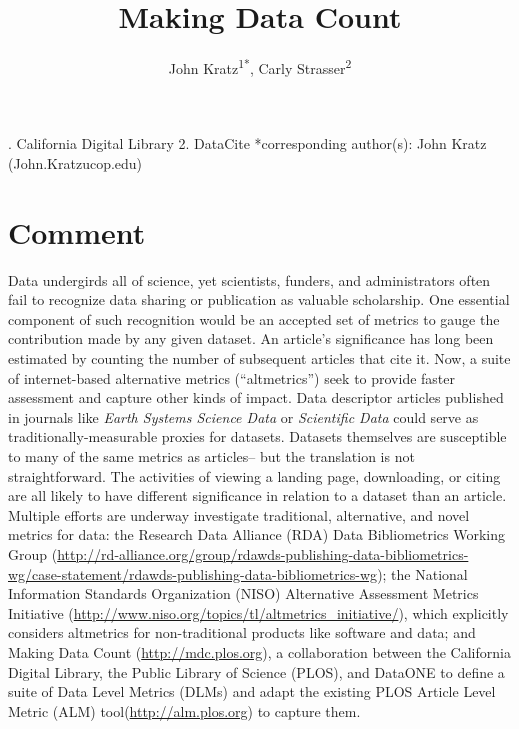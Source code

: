 \documentclass[english]{article}
\begin{document}
\title{Making Data Count}


\author{John Kratz\textsuperscript{1{*}}, Carly Strasser\textsuperscript{2}}

. California Digital Library 2. DataCite 
{*}corresponding author(s): John Kratz (John.Kratzucop.edu)


\section*{Comment}


Data undergirds all of science, yet scientists, funders, and administrators often fail to recognize data sharing or publication as valuable scholarship.
One essential component of such recognition would be an accepted set of metrics to gauge the contribution made by any given dataset.
An article's significance has long been estimated by counting the number of subsequent articles that cite it. 
Now, a suite of internet-based alternative metrics (``altmetrics'') seek to provide faster assessment and capture other kinds of impact\cite{priem_altmetrics_2012}.
Data descriptor articles published in journals like \textit{Earth Systems Science Data} or \textit{Scientific Data} could serve as traditionally-measurable proxies for datasets\cite{pfeiffenberger_earth_2008, editors_more_2014}.
Datasets themselves are susceptible to many of the same metrics as articles-- but the translation is not straightforward.
The activities of viewing a landing page, downloading, or citing are all likely to have different significance in relation to a dataset than an article.
Multiple efforts are underway investigate traditional, alternative, and novel metrics for data: the Research Data Alliance (RDA) Data Bibliometrics Working Group (\url{http://rd-alliance.org/group/rdawds-publishing-data-bibliometrics-wg/case-statement/rdawds-publishing-data-bibliometrics-wg}{}); the National Information Standards Organization (NISO) Alternative Assessment Metrics Initiative (\url{http://www.niso.org/topics/tl/altmetrics_initiative/}), which explicitly considers altmetrics for non-traditional products like software and data; and Making Data Count (\url{http://mdc.plos.org}), a collaboration between the California Digital Library, the Public Library of Science (PLOS), and DataONE to define a suite of Data Level Metrics (DLMs) and adapt the existing PLOS Article Level Metric (ALM) tool(\url{http://alm.plos.org}) to capture them.
\end{document}
